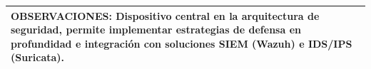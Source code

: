 \begin{table}[H]
\begin{tabular}{|p{}|p{}|p{}|}
		\multicolumn{3}{|p{0.97\textwidth}|}{
		\textbf{OBSERVACIONES:} Dispositivo central en la arquitectura de seguridad, permite implementar estrategias de defensa en profundidad e integración con soluciones SIEM (Wazuh) e IDS/IPS (Suricata).
		} \\ \hline

	\end{tabular}
\end{table}